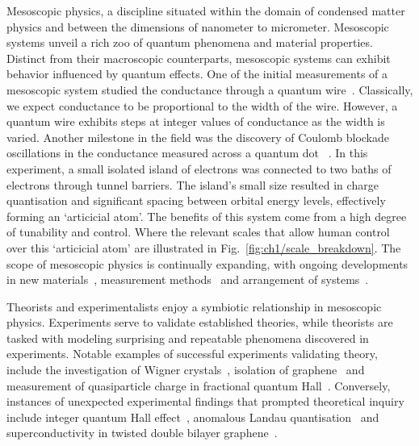 Mesoscopic physics, a discipline situated within the domain of condensed matter physics and between the dimensions of nanometer to micrometer. Mesoscopic systems unveil a rich zoo of quantum phenomena and material properties. 
Distinct from their macroscopic counterparts, mesoscopic systems can exhibit behavior influenced by quantum effects. One of the initial measurements of a mesoscopic system studied the conductance through a quantum wire~\cite{qpc_first_measurement, qpc_second_measurement}. 
Classically, we expect conductance to be proportional to the width of the wire. 
However, a quantum wire exhibits steps at integer values of conductance as the width is varied. 
Another milestone in the field was the discovery of Coulomb blockade oscillations in the conductance measured across a quantum dot ~\cite{first_charging_of_qd}. 
In this experiment, a small isolated island of electrons was connected to two baths of electrons through tunnel barriers. 
The island's small size resulted in charge quantisation and significant spacing between orbital energy levels, effectively forming an `articicial atom'. 
The benefits of this system come from a high degree of tunability and control. Where the relevant scales that allow human control over this `articicial atom' are illustrated in Fig.~\ref{fig:ch1/scale_breakdown}.
The scope of mesoscopic physics is continually expanding, with ongoing developments in new materials~\cite{manfra_inas}, measurement methods~\cite{child_meas} and arrangement of systems~\cite{borsoi2022shared, raysu}.

Theorists and experimentalists enjoy a symbiotic relationship in mesoscopic physics. Experiments serve to validate established theories, while theorists are tasked with modeling surprising and repeatable phenomena discovered in experiments. Notable examples of successful experiments validating theory, include the investigation of Wigner crystals~\cite{wigner_solid}, isolation of graphene~\cite{graphene} and measurement of quasiparticle charge in fractional quantum Hall~\cite{fractional_charge}. Conversely, instances of unexpected experimental findings that prompted theoretical inquiry include integer quantum Hall effect~\cite{klitzing}, anomalous Landau quantisation~\cite{landau_quantisation} and superconductivity in twisted double bilayer graphene~\cite{raysu}.

